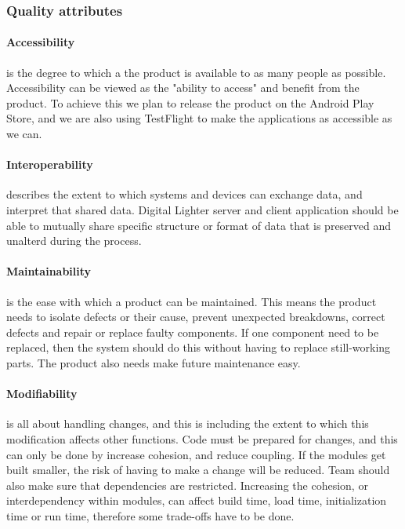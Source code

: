 \subsubsection{Quality attributes}
\label{sec:quality_attributes}

\paragraph{Accessibility}
is the degree to which a the product is available to as many people as possible. 
Accessibility can be viewed as the "ability to access" and benefit from the product. 
To achieve this we plan to release the product on the Android Play Store, and we are also using TestFlight to make the applications as accessible as we can.

\paragraph{Interoperability}
describes the extent to which systems and devices can exchange data, and interpret that shared data. Digital Lighter server and client application should be able to mutually share specific structure or format of data that is preserved and unalterd during the process.  

\paragraph{Maintainability}
is the ease with which a product can be maintained. This means the product needs to isolate defects or their cause, prevent unexpected breakdowns, correct defects and repair or replace faulty components. If one component need to be replaced, then the system should do this without having to replace still-working parts. The product also needs make future maintenance easy.

\paragraph{Modifiability}
is all about handling changes, and this is including the extent to which this modification affects other functions. 
Code must be prepared for changes, and this can only be done by increase cohesion, and reduce coupling. 
If the modules get built smaller, the risk of having to make a change will be reduced. 
Team should also make sure that dependencies are restricted. 
Increasing the cohesion, or interdependency within modules, can affect build time, load time, initialization time or run time, therefore some trade-offs have to be done.

